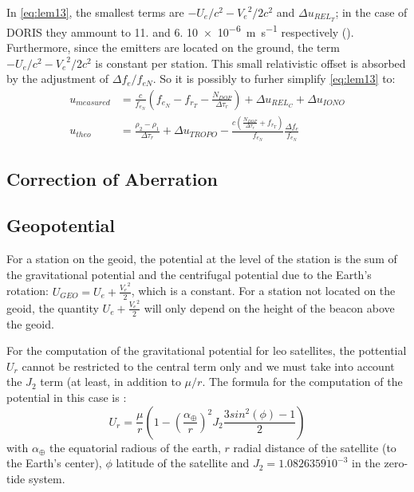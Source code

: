 In \ref{eq:lem13}, the smallest terms are \(-U_e / c^2 - {V_e}^2 / 2 c^2\) and 
\(\Delta u_{{REL}_T}\); in the case of DORIS they ammount to \num{11.} and 
\num{6.} \SI{10e-6}{\meter\per\second} respectively (\cite{lemoine-2016}). 
Furthermore, since the emitters are located on the ground, the term 
\(-U_e / c^2 - {V_e}^2 / 2 c^2\) is constant per station. This small 
relativistic offset is absorbed by the adjustment of \(\Delta f_e / f_{eN}\). 
So it is possibly to furher simplify \ref{eq:lem13} to:
\begin{subequations} \label{eq:lem17}
    \begin{align}
        u_{measured} & = \frac{c}{f_{e_N}} (f_{e_N} - f_{r_T} -
          \frac{N_{DOP}}{\Delta\tau_r}) + 
          \Delta u_{{REL}_C} + \Delta u_{IONO} \label{eq:lem17a}\\
        u_{theo} &= \frac{\rho_2 - \rho_1}{\Delta\tau_r} + \Delta u_{TROPO} - 
          \frac{c(\frac{N_{DOP}}{\Delta\tau_r} + f_{r_T})}{f_{e_N}} 
          \frac{\Delta f_e}{f_{e_N}} \label{eq:lem17b}
    \end{align}
\end{subequations}

\subsection{Correction of Aberration}

\subsection{Geopotential}
For a station on the geoid, the potential at the level of the station is the sum 
of the gravitational potential and the centrifugal potential due to the Earth's 
rotation: \(U_{GEO} = U_e + \frac{{V_e}^2}{2}\), which is a constant. For a station 
not located on the geoid, the quantity \(U_e + \frac{{V_e}^2}{2}\) will only depend 
on the height of the beacon above the geoid.

For the computation of the gravitational potential for \gls{leo} satellites, 
the pottential \(U_r\) cannot be restricted to the central term only and we must 
take into account the \(J_2\) term (at least, in addition to \(\mu / r\). The formula 
for the computation of the potential in this case is \cite{lemoine-2016}:
\begin{equation}
  \label{eq:lem18}
  U_r = \frac{\mu}{r} \left( 1- \left(\frac{\alpha_{\oplus}}{r}\right)^2 
    J_2 \frac{3 sin^2(\phi) - 1}{2} \right)
\end{equation}
with \(\alpha_{\oplus}\) the equatorial radious of the earth, \(r\) radial 
distance of the satellite (to the Earth's center), \(\phi\) latitude of the 
satellite and \(J_2 = 1.0826359 \dot 10^{-3}\) in the zero-tide system.

